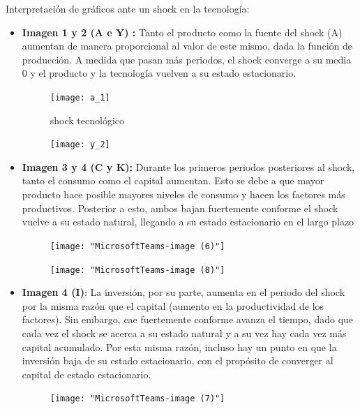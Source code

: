 \documentclass{article}
\begin{document}
Interpretación de gráficos ante un shock en la tecnología:
 
\begin{itemize}

\item \textbf{Imagen 1 y 2 (A e Y) :} Tanto el producto como la fuente del shock (A) aumentan de manera proporcional al valor de este mismo, dada la función de producción. A medida que pasan más periodos, el shock converge a su media 0 y el producto y la tecnología vuelven a su estado estacionario.
\begin{figure}[h]
	\centering
	\texttt{[image: a\_1]}
	\caption{shock tecnológico}
	\label{fig:a1}
\end{figure}

\begin{figure}[h]
	\centering
	\texttt{[image: y\_2]}
	\caption{}
	\label{fig:a1}
\end{figure}
\newpage
\item \textbf{Imagen 3 y 4 (C y K):} Durante los primeros periodos posteriores al shock, tanto el consumo como el capital aumentan. Esto se debe a que mayor producto hace posible mayores niveles de consumo y hacen los factores más productivos. Posterior a esto, ambos bajan fuertemente conforme el shock vuelve a su estado natural, llegando a su estado estacionario en el largo plazo

\begin{figure}[h]
	\centering
	\texttt{[image: "MicrosoftTeams-image (6)"]}
	\label{fig:microsoftteams-image-6}
\end{figure}
\begin{figure}[h]
	\centering
	\texttt{[image: "MicrosoftTeams-image (8)"]}
	\caption{}
	\label{fig:microsoftteams-image-8}
\end{figure}


\item \textbf{Imagen 4 (I)}: La inversión, por su parte, aumenta en el periodo del shock por la misma razón que el capital (aumento en la productividad de los factores). Sin embargo, cae fuertemente conforme avanza el tiempo,  dado que cada vez el shock se acerca a su estado natural y a su vez hay cada vez más capital acumulado. Por esta misma razón, incluso hay un punto en que la inversión baja de su estado estacionario, con el propósito de converger al capital de estado estacionario.
\begin{figure}[h!]
	\centering
	\texttt{[image: "MicrosoftTeams-image (7)"]}
	\caption{}
	\label{fig:microsoftteams-image-7}
\end{figure}


\end{itemize}
\end{document}

